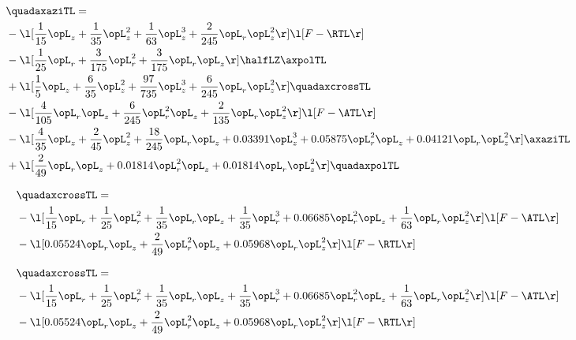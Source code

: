 \begin{alignat}{2} 
\label{eq:quadaxaziTL_1} 
& \quadaxaziTL = \\ 
& - \l[ \frac{1}{15} \opL_z + \frac{1}{35} \opL_z^{2} + \frac{1}{63} \opL_z^{3} + \frac{2}{245} \opL_r \opL_z^{2}  \r] \l[ F - \RTL \r] \nonumber \\ 
& - \l[ \frac{1}{25} \opL_r + \frac{3}{175} \opL_r^{2} + \frac{3}{175} \opL_r \opL_z  \r] \halfLZ \axpolTL \nonumber \\ 
& + \l[ \frac{1}{5} \opL_z + \frac{6}{35} \opL_z^{2} + \frac{97}{735} \opL_z^{3} + \frac{6}{245} \opL_r \opL_z^{2}  \r] \quadaxcrossTL \nonumber \\ 
& - \l[ \frac{4}{105} \opL_r \opL_z + \frac{6}{245} \opL_r^{2} \opL_z + \frac{2}{135} \opL_r \opL_z^{2}  \r] \l[ F - \ATL \r] \nonumber \\ 
& - \l[ \frac{4}{35} \opL_z + \frac{2}{45} \opL_z^{2} + \frac{18}{245} \opL_r \opL_z +  0.03391 \opL_z^{3} +  0.05875 \opL_r^{2} \opL_z +  0.04121 \opL_r \opL_z^{2}  \r] \axaziTL \nonumber \\ 
& + \l[ \frac{2}{49} \opL_r \opL_z +  0.01814 \opL_r^{2} \opL_z +  0.01814 \opL_r \opL_z^{2}  \r] \quadaxpolTL \nonumber \\ 
\end{alignat} 


\begin{alignat}{2} 
\label{eq:quadaxcrossTL_2} 
& \quadaxcrossTL = \\ 
& - \l[ \frac{1}{15} \opL_r + \frac{1}{25} \opL_r^{2} + \frac{1}{35} \opL_r \opL_z + \frac{1}{35} \opL_r^{3} +  0.06685 \opL_r^{2} \opL_z + \frac{1}{63} \opL_r \opL_z^{2}  \r] \l[ F - \ATL \r] \nonumber \\ 
& - \l[  0.05524 \opL_r \opL_z + \frac{2}{49} \opL_r^{2} \opL_z +  0.05968 \opL_r \opL_z^{2}  \r] \l[ F - \RTL \r] \nonumber \\ 
\end{alignat} 


\begin{alignat}{2} 
\label{eq:quadaxcrossTL_3} 
& \quadaxcrossTL = \\ 
& - \l[ \frac{1}{15} \opL_r + \frac{1}{25} \opL_r^{2} + \frac{1}{35} \opL_r \opL_z + \frac{1}{35} \opL_r^{3} +  0.06685 \opL_r^{2} \opL_z + \frac{1}{63} \opL_r \opL_z^{2}  \r] \l[ F - \ATL \r] \nonumber \\ 
& - \l[  0.05524 \opL_r \opL_z + \frac{2}{49} \opL_r^{2} \opL_z +  0.05968 \opL_r \opL_z^{2}  \r] \l[ F - \RTL \r] \nonumber \\ 
\end{alignat} 


